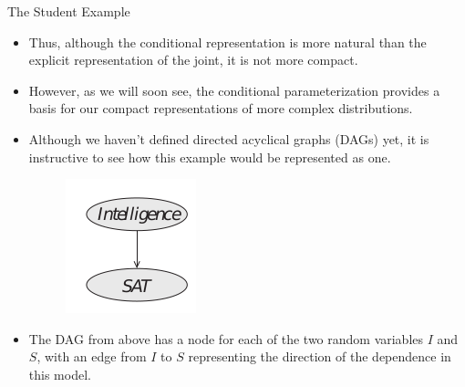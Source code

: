 \documentclass[handout]{beamer}
\begin{document}
\begin{frame}{The Student Example}
\scriptsize{
\begin{itemize}

\item Thus, although the conditional representation is more natural
than the explicit representation of the joint, it is not more compact.

\item However, as we will soon see, the conditional parameterization provides a basis for our compact representations of more complex distributions.


\item Although we haven't defined directed acyclical graphs (DAGs) yet, it is instructive to see how this example would be represented as one. 

\begin{figure}[h!]
	\centering
	\includegraphics[scale=0.6]{pics/sat1.png}
	\end{figure} 


\item The DAG from above has a node for each of the two random variables $I$ and $S$, with an edge from $I$ to $S$ representing the direction of the dependence in this model.


\end{itemize}



} 

\end{frame}
\end{document}
